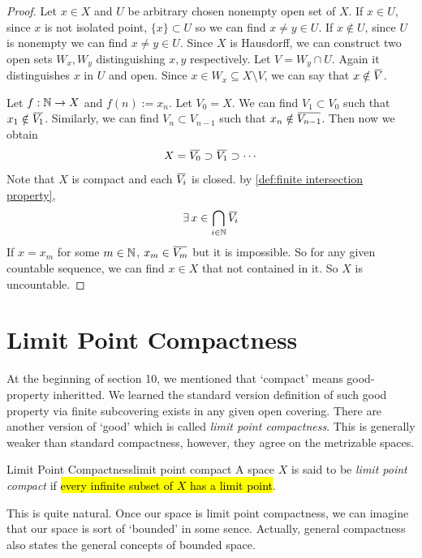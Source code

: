 \documentclass[12pt, a4paper, twoside]{article}
\newcommand{\overbar}[1]{\mkern 1.5mu\overline{\mkern-1.5mu#1\mkern-1.5mu}\mkern 1.5mu}
\theoremstyle{plain}
\begin{document}
\begin{proof}
    Let $x \in X$ and $U$ be arbitrary chosen nonempty open set of $X$. 
    If $x \in U$, since $x$ is not isolated point, $\{x\} \subset U$ so we can find $x \neq y \in U$. 
    If $x \notin U$, since $U$ is nonempty we can find $x \neq y \in U$. 
    Since $X$ is Hausdorff, we can construct two open sets $W_x, W_y$ distinguishing $x, y$ respectively. 
    Let $V = W_y \cap U$. Again it distinguishes $x$ in $U$ and open. Since $x \in W_x \subseteq X \setminus V$, 
    we can say that $x \notin \overbar{V}$. 

    Let $f: {\mathbb {N}} \rightarrow X$ and $f(n) := x_n$. 
    Let $V_0 = X$. We can find $V_1 \subset V_0$ such that $x_1 \notin \overbar{V_1}$. 
    Similarly, we can find $V_n \subset V_{n-1}$ such that $x_n \notin \overbar{V_{n-1}}$. 
    Then now we obtain 
    \[X = \overbar{V_0} \supset \overbar{V_1} \supset \cdots\]
    Note that $X$ is compact and each $\overbar{V_i}$ is closed. 
    by \ref{def:finite intersection property}, 
    \[\exists \, x \in \bigcap_{i \in \BN} \overbar{V_i}\]
    If $x = x_m$ for some $m \in {\mathbb {N}}$, $x_m \in \overbar{V_m}$ but it is impossible. 
    So for any given countable sequence, we can find $x \in X$ that not contained in it. 
    So $X$ is uncountable. 
\end{proof}

\newpage

\section{Limit Point Compactness}

At the beginning of section 10, we mentioned that \lq compact' means good-property inheritted. 
We learned the standard version definition of such good property via finite subcovering exists in any given open covering. 
There are another version of \lq good' which is called \textit{limit point compactness}. 
This is generally weaker than standard compactness, however, they agree on the metrizable spaces. 

\begin{defn}{Limit Point Compactness}{limit point compact}
    A space $X$ is said to be \textit{limit point compact} if \hl{every infinite subset of $X$ has a limit point}. 
\end{defn}

This is quite natural. Once our space is limit point compactness, we can imagine that 
our space is sort of \lq bounded' in some sence. Actually, general compactness also states the 
general concepts of bounded space. 
\end{document}
